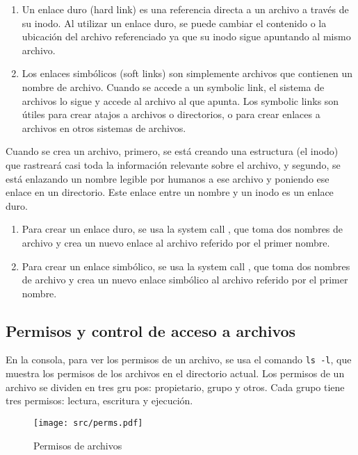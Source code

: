 \documentclass[openany]{book}
\begin{document}
\begin{enumerate}
    \item Un enlace duro (\colorbox{yellow!20}{hard link}) es una referencia directa a un archivo a través de su inodo. Al utilizar un enlace duro, se puede cambiar el contenido o la ubicación del archivo referenciado ya que su inodo sigue apuntando al mismo archivo.
    \item Los enlaces simbólicos (\colorbox{yellow!20}{soft links}) son simplemente archivos que contienen un nombre de archivo. Cuando se accede a un symbolic link, el sistema de archivos lo sigue y accede al archivo al que apunta. Los symbolic links son útiles para crear atajos a archivos o directorios, o para crear enlaces a archivos en otros sistemas de archivos. 
\end{enumerate}

Cuando se crea un archivo, primero, se está creando una estructura (el inodo) que rastreará casi toda la información relevante sobre el archivo, y segundo, se está enlazando un nombre legible por humanos a ese archivo y poniendo ese enlace en un directorio. Este enlace entre un nombre y un inodo es un enlace duro. 

\begin{enumerate}
    \item Para crear un enlace duro, se usa la system call , que toma dos nombres de archivo y crea un nuevo enlace al archivo referido por el primer nombre.
    \item Para crear un enlace simbólico, se usa la system call , que toma dos nombres de archivo y crea un nuevo enlace simbólico al archivo referido por el primer nombre.
\end{enumerate}

\subsection{Permisos y control de acceso a archivos}
En la consola, para ver los permisos de un archivo, se usa el comando \texttt{ls -l}, que muestra los permisos de los archivos en el directorio actual. Los permisos de un archivo se dividen en tres gru   pos: \colorbox{yellow!20}{propietario}, \colorbox{yellow!20}{grupo} y \colorbox{yellow!20}{otros}. Cada grupo tiene tres permisos: \colorbox{yellow!20}{lectura}, \colorbox{yellow!20}{escritura} y \colorbox{yellow!20}{ejecución}.

\begin{figure}[h]
    \centering
    \texttt{[image: src/perms.pdf]}
    \caption{Permisos de archivos}
\end{figure}
\end{document}
